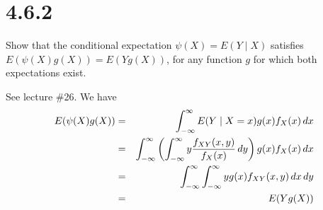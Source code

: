 \section*{4.6.2}
Show that the conditional expectation $\psi(X)=E(Y\mid X)$
satisfies $E(\psi(X)g(X))=E(Yg(X))$, for any function $g$
for which both expectations exist.

\bigskip
\noindent
See lecture \#26. We have
\begin{eqnarray*}
E(\psi(X)g(X))
&=&\int_{-\infty}^{\infty}
E(Y\mid X=x)g(x)f_X(x)\,dx\\
&=&\int_{-\infty}^\infty
\left(\int_{-\infty}^\infty y{f_{XY}(x,y)\over f_X(x)}\,dy\right)
g(x)f_X(x)\,dx\\
&=&\int_{-\infty}^\infty\int_{-\infty}^\infty
yg(x)f_{XY}(x,y)\,dx\,dy\\
&=&E(Yg(X))
\end{eqnarray*}

